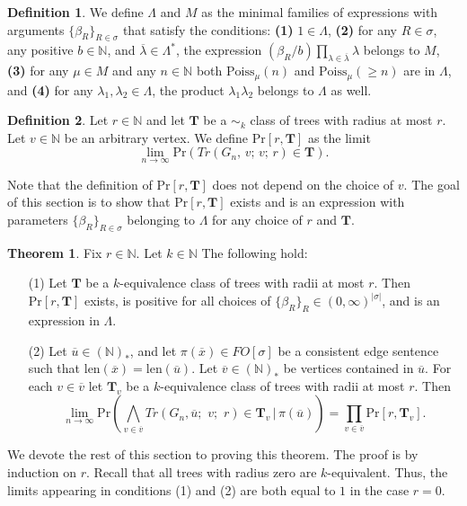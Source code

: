 \documentclass[12pt,notitlepage,a4paper]{article}
\theoremstyle{definition}
\newtheorem{theorem}{Theorem}[section]
\newtheorem{definition}{Definition}[section]
\newcommand{\N}{\mathbb{N}}
\newcommand{\Ln}{\lim\limits_{n\to \infty}}
\newcommand{\len}{\mathrm{len}}
\begin{document}
\begin{definition} \label{def:treeprobabilies}
We define $\Lambda$ and $M$ as the minimal families
of expressions with arguments $\{\beta_R\}_{R\in\sigma}$
that satisfy the conditions: \textbf{(1)}
$1\in \Lambda$, \textbf{(2)} 
for any $R\in \sigma$, any positive $b\in \N$,
and $\overline{\lambda} \in \Lambda^*$,
the expression $(\beta_R/b) \prod_{\lambda\in \overline{\lambda}}
\lambda$
belongs to $M$, \textbf{(3)}
for any $\mu\in M$ and any $n\in \N$ both
$\mathrm{Poiss}_{\mu}(n)$ and $\mathrm{Poiss}_\mu(\geq n)$ are in $\Lambda$, 
and  \textbf{(4)} for any $\lambda_1,\lambda_2 \in \Lambda$, the
product $\lambda_1\lambda_2$ belongs to $\Lambda$ as well.
\end{definition}


\begin{definition}
	Let $r\in \N$ and let $\mathbf{T}$ be a $\sim_k$ class
	of trees with radius at most $r$. Let $v\in \N$ be an arbitrary 
	vertex. We define $\mathrm{Pr}[r,\mathbf{T}]$ as the limit
	\[
	\Ln \mathrm{Pr}\left(
	Tr(G_n,\,v;\,v;\,r)\in \mathbf{T}\right).
	\]
\end{definition}

Note that the 
definition of  $\mathrm{Pr}[r,\mathbf{T}]$ does not depend on the
choice of $v$. The goal of this section is to show 
that $\mathrm{Pr}[r,\mathbf{T}]$ exists and is
an expression with parameters
$\{\beta_R\}_{R\in\sigma}$ belonging to $\Lambda$ 
for any choice of $r$ and $\mathbf{T}$. \par



\begin{theorem} \label{thm:BigTrees}
	Fix $r\in \N$. Let $k\in \N$ The following hold:
	\begin{itemize}
		\item[(1)] Let $\mathbf{T}$ be a
		$k$-equivalence class of trees with radii at most $r$.	Then 
		$
		\mathrm{Pr}[r,\mathbf{T}]
		$
		exists,
		is positive for all choices of 
		$\{\beta_R\}_{R}\in (0,\infty)^{|\sigma|}$,
		and is an expression
		in $\Lambda$.
		\item[(2)] Let $\overline{u}\in (\N)_*$,
		and let $\pi(\overline{x})\in FO[\sigma]$ be a consistent
		edge sentence such that 
		$\len(\overline{x})=\len(\overline{u})$.
		Let $\overline{v}\in (\N)_*$ be vertices contained
		in $\overline{u}$. For each $v\in \overline{v}$
		let $\mathbf{T}_v$ be a $k$-equivalence class
		of trees with radii	at most $r$. Then
		\[
		\Ln \mathrm{Pr}\left( \bigwedge_{v\in \overline{v}} 
		Tr\left(G_n, \overline{u};\,\,v;\,\,r\right)\in \mathbf{T}_v 
		\, | \, \pi(\overline{u})
		\right)= \prod_{v\in \overline{v}} \mathrm{Pr}[r,\mathbf{T}_v]. \]	 	
	\end{itemize}
\end{theorem}
We devote the rest of this section to proving this
theorem. The proof is by induction on $r$. 
Recall that	all trees with radius zero are $k$-equivalent. Thus,
the limits appearing in conditions (1) and (2) are both equal to $1$
in the case $r=0$. 
\end{document}
